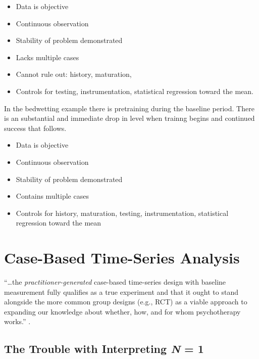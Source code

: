 \documentclass[
  english,
]{book}
\providecommand{\tightlist}{%
  \setlength{\itemsep}{0pt}\setlength{\parskip}{0pt}}
\begin{document}
\begin{itemize}
\tightlist
\item
  Data is objective
\item
  Continuous observation
\item
  Stability of problem demonstrated
\item
  Lacks multiple cases
\item
  Cannot rule out: history, maturation,
\item
  Controls for testing, instrumentation, statistical regression toward the mean.
\end{itemize}

In the bedwetting example there is pretraining during the baseline period. There is an substantial and immediate drop in level when trainng begins and continued success that follows.

\begin{itemize}
\tightlist
\item
  Data is objective
\item
  Continuous observation
\item
  Stability of problem demonstrated
\item
  Contains multiple cases
\item
  Controls for history, maturation, testing, instrumentation, statistical regression toward the mean
\end{itemize}

\hypertarget{case-based-time-series-analysis}{%
\section{Case-Based Time-Series Analysis}\label{case-based-time-series-analysis}}

``\ldots the \emph{practitioner-generated} case-based time-series design with baseline measurement fully qualifies as a true experiment and that it ought to stand alongside the more common group designs (e.g., RCT) as a viable approach to expanding our knowledge about whether, how, and for whom psychotherapy works.'' \citep[p.~77]{borckardt_clinical_2008}.

\hypertarget{the-trouble-with-interpreting-n-1}{%
\subsection{\texorpdfstring{The Trouble with Interpreting \emph{N} = 1}{The Trouble with Interpreting N = 1}}\label{the-trouble-with-interpreting-n-1}}
\end{document}
